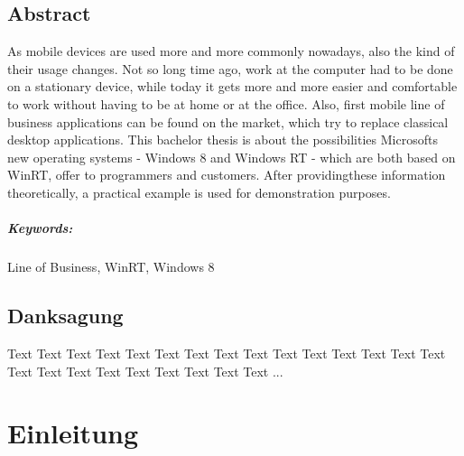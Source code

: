 \documentclass[a4paper,bibtotoc,oneside]{scrbook}
\begin{document}
\section*{Abstract}\thispagestyle{empty}
As mobile devices are used more and more commonly nowadays, also the kind of their usage changes. Not so long time ago, work at the computer had to be done on a stationary device, while today it gets more and more easier and comfortable to work without having to be at home or at the office.
\newline
Also, first mobile line of business applications can be found on the market, which try to replace classical desktop applications.
\newline
This bachelor thesis is about the possibilities Microsofts new operating systems - Windows 8 and Windows RT - which are both based on WinRT, offer to programmers and customers. After providingthese information theoretically, a practical example is used for demonstration purposes.
\\ \vfill
\paragraph*{Keywords:} Line of Business, WinRT, Windows 8
\newpage

\section*{Danksagung}
\thispagestyle{empty}
Text Text Text Text Text Text Text Text Text Text Text Text Text Text Text Text Text Text Text Text Text Text Text Text ...
\newpage

\tableofcontents\thispagestyle{empty}
\newpage

\setcounter{page}{1}


\chapter[Einleitung]{Einleitung}
\end{document}
